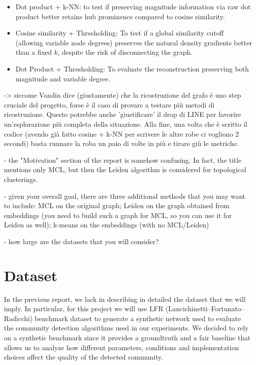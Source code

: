 \documentclass[a4paper,11pt]{article}
\begin{document}
\begin{itemize}
    \item Dot product + k-NN: to test if preserving magnitude information via raw dot product better retains hub prominence compared to cosine similarity.
    \item Cosine similarity + Thresholding: To test if a global similarity cutoff (allowing variable node degrees) preserves the natural density gradients better than a fixed $k$, despite the risk of disconnecting the graph.
    \item Dot Product + Thresholding: To evaluate the reconstruction preserving both magnitude and variable degree.
\end{itemize}

-> siccome Vandin dice (giustamente) che la ricostruzione del grafo è uno step cruciale del progetto, forse è il caso di provare a testare più metodi di ricostruzione. Questo potrebbe anche 'giustificare' il drop di LINE per favorire un'esplorazione più completa della situazione. Alla fine, una volta che è scritto il codice (avendo già fatto cosine + k-NN per scrivere le altre robe ci vogliono 2 secondi) basta runnare la roba un paio di volte in più e tirare giù le metriche.   

- the "Motivation" section of the report is somehow confusing. In fact, the title mentions only MCL, but then the Leiden algorithm is considered for topological clusterings.

- given your overall goal, there are three additional methods that you may want to include: MCL on the original graph; Leiden on the graph obtained from embeddings (you need to build such a graph for MCL, so you can use it for Leiden as well); k-means on the embeddings (with no MCL/Leiden)

- how large are the datasets that you will consider?

\section*{Dataset}
In the previous report, we lack in describing in detailed the dataset that we will imply. In particular, for this project we will use LFR (Lancichinetti–Fortunato–Radicchi) benchmark dataset to generate a
synthetic network used to evaluate the community detection algorithms used in our experiments. We decided to rely on a synthetic benchmark since it provides a groundtruth and a 
fair baseline that allows us to analyze how different parameters, conditions and implementation choices affect the quality of the detected community.
\end{document}
